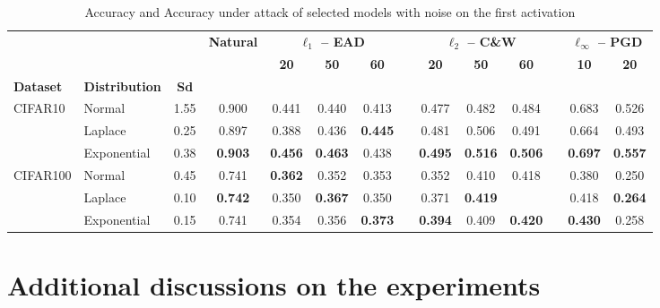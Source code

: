 \begin{table}[htbp]
  \caption{Accuracy and Accuracy under attack of selected models with noise on the first activation}
   \label{table:ap3-attack_noise_activation-appendix}%
    \begin{tabular}{llcccccccccccc}
    \toprule
      & & & \multirow{2}[3]{*}{\textbf{Natural}} & \multicolumn{3}{c}{\textbf{$\ell_1$ -- EAD}} & & \multicolumn{3}{c}{\textbf{$\ell_2$ -- C\&W}} & & \multicolumn{2}{c}{\textbf{$\ell_\infty$ -- PGD}} \\
      \cmidrule{5-7}\cmidrule{9-11}\cmidrule{13-14} & & & & \textbf{20} & \textbf{50} & \textbf{60} & & \textbf{20} & \textbf{50} & \textbf{60} &       & \textbf{10} & \textbf{20} \\
      \textbf{Dataset} & \multicolumn{1}{c}{\textbf{Distribution}} & \textbf{Sd} & & & & & & & & & & &  \\
    \midrule
    \multirow{3}[1]{*}{CIFAR10} & Normal & 1.55  & 0.900 & 0.441 & 0.440 & 0.413 & & 0.477 & 0.482 & 0.484 & & 0.683 & 0.526 \\
     & Laplace & 0.25  & 0.897 & 0.388 & 0.436 & \textbf{0.445} & & 0.481 & 0.506 & 0.491 & & 0.664 & 0.493 \\
     & Exponential & 0.38  & \textbf{0.903} & \textbf{0.456} & \textbf{0.463} & 0.438 & & \textbf{0.495} & \textbf{0.516} & \textbf{0.506} &       & \textbf{0.697} & \textbf{0.557} \\
    \midrule
    \multirow{3}[2]{*}{CIFAR100} & Normal & 0.45  & 0.741 & \textbf{0.362} & 0.352 & 0.353 & & 0.352 & 0.410 & 0.418 & & 0.380 & 0.250 \\
     & Laplace & 0.10  & \textbf{0.742} & 0.350 & \textbf{0.367} & 0.350 & & 0.371 & \textbf{0.419} & & & 0.418 & \textbf{0.264} \\
     & Exponential & 0.15  & 0.741 & 0.354 & 0.356 & \textbf{0.373} & & \textbf{0.394} & 0.409 & \textbf{0.420} & & \textbf{0.430} & 0.258 \\
    \bottomrule
    \end{tabular}%
\end{table}%



\section{Additional discussions on the experiments}

